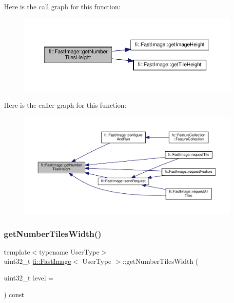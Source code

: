 Here is the call graph for this function\+:
\nopagebreak
\begin{figure}[H]
\begin{center}
\leavevmode
\includegraphics[width=350pt]{dc/d6b/classfi_1_1FastImage_a84984ae1d928ef604866f126ed0a583b_cgraph}
\end{center}
\end{figure}
Here is the caller graph for this function\+:
\nopagebreak
\begin{figure}[H]
\begin{center}
\leavevmode
\includegraphics[width=350pt]{dc/d6b/classfi_1_1FastImage_a84984ae1d928ef604866f126ed0a583b_icgraph}
\end{center}
\end{figure}
\mbox{\label{classfi_1_1FastImage_a5bb1377a075185ce8445b1dcb6886b6e}} 
\subsubsection{\texorpdfstring{get\+Number\+Tiles\+Width()}{getNumberTilesWidth()}}
{\footnotesize\ttfamily template$<$typename User\+Type$>$ \\
uint32\+\_\+t \hyperlink{classfi_1_1FastImage}{fi\+::\+Fast\+Image}$<$ User\+Type $>$\+::get\+Number\+Tiles\+Width (\begin{DoxyParamCaption}\item[{uint32\+\_\+t}]{level = {} }\end{DoxyParamCaption}) const\hspace{0.3cm}{\ttfamily [inline]}}



